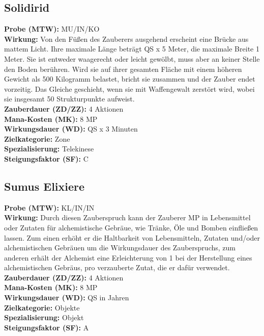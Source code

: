 \subsection{Solidirid}
\label{chap:solidirid}
\textbf{Probe (MTW):} MU/IN/KO \\
\textbf{Wirkung:} Von den Füßen des Zauberers ausgehend erscheint eine Brücke aus mattem Licht. Ihre maximale Länge beträgt QS x 5 Meter, die maximale Breite 1 Meter. Sie ist entweder waagerecht oder leicht gewölbt, muss aber an keiner Stelle den Boden berühren. Wird sie auf ihrer gesamten Fläche mit einem höheren Gewicht als 500 Kilogramm belastet, bricht sie zusammen und der Zauber endet vorzeitig. Das Gleiche geschieht, wenn sie mit Waffengewalt zerstört wird, wobei sie insgesamt 50 Strukturpunkte aufweist.\\
\textbf{Zauberdauer (ZD/ZZ):} 4 Aktionen \\
\textbf{Mana-Kosten (MK):} 8 MP \\
\textbf{Wirkungsdauer (WD):} QS x 3 Minuten \\
\textbf{Zielkategorie:} Zone \\
\textbf{Spezialisierung:} Telekinese \\
\textbf{Steigungsfaktor (SF):} C


\subsection{Sumus Elixiere}
\label{chap:sumus_elixiere}
\textbf{Probe (MTW):} KL/IN/IN \\
\textbf{Wirkung:} Durch diesen Zauberspruch kann der Zauberer MP in Lebensmittel oder Zutaten für alchemistische Gebräue, wie Tränke, Öle und Bomben einfließen lassen. Zum einen erhöht er die Haltbarkeit von Lebensmitteln, Zutaten und/oder alchemistischen Gebräuen um die Wirkungsdauer des Zauberspruchs, zum anderen erhält der Alchemist eine Erleichterung von 1 bei der Herstellung eines alchemistischen Gebräus, pro verzauberte Zutat, die er dafür verwendet. \\
\textbf{Zauberdauer (ZD/ZZ):} 4 Aktionen \\
\textbf{Mana-Kosten (MK):} 8 MP \\
\textbf{Wirkungsdauer (WD):} QS in Jahren \\
\textbf{Zielkategorie:} Objekte \\
\textbf{Spezialisierung:} Objekt \\
\textbf{Steigungsfaktor (SF):} A


